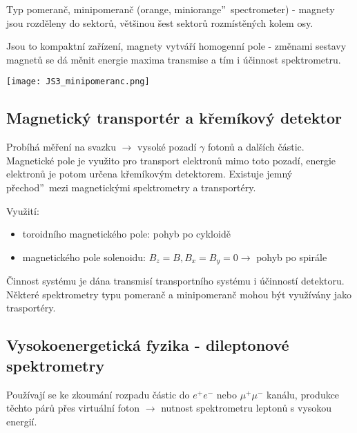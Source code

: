 \documentclass[../../main.tex]{subfiles}
\begin{document}
Typ pomeranč, minipomeranč (\quotedblbase orange, miniorange\textquotedblright ~spectrometer) - magnety jsou rozděleny do sektorů, většinou šest sektorů rozmístěných kolem osy.

Jsou to kompaktní zařízení, magnety vytváří homogenní pole - změnami sestavy magnetů se dá měnit energie maxima transmise a tím i účinnost spektrometru.

\begin{center}
	\texttt{[image: JS3\_minipomeranc.png]}
\end{center}

\subsection{Magnetický transportér a křemíkový detektor}

Probíhá měření na svazku $\rightarrow$ vysoké pozadí $\gamma$ fotonů a dalších částic. Magnetické pole je využito pro transport elektronů mimo toto pozadí, energie elektronů je potom určena křemíkovým detektorem. Existuje \quotedblbase jemný přechod\textquotedblright ~mezi magnetickými spektrometry a transportéry. 

Využití:
\begin{itemize}
	\item toroidního magnetického pole: pohyb po cykloidě
	\item magnetického pole solenoidu: $B_z = B, B_x = B_y = 0 \rightarrow $ pohyb po spirále
\end{itemize}	

Činnost systému je dána transmisí transportního systému i účinností detektoru. Některé spektrometry typu pomeranč a minipomeranč mohou být využívány jako trasportéry.
\subsection{Vysokoenergetická fyzika - dileptonové spektrometry}

Používají se ke zkoumání rozpadu částic do $e^+ e^- $ nebo $\mu^+ \mu^- $ kanálu, produkce těchto párů přes virtuální foton $\rightarrow$ nutnost spektrometru leptonů s vysokou energií.
\end{document}

